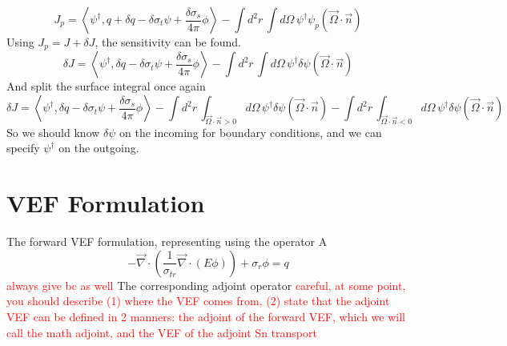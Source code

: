 \documentclass{article}
\newcommand{\vO}{\vec{\Omega}}
\newcommand{\bra}{\left\langle}
\newcommand{\ket}{\right\rangle}
\newcommand{\vdiv}{\vec{\nabla} \cdot}
\begin{document}
\[
J_p = \bra \psi^\dag ,  q + \delta q - \delta \sigma_t \psi + \frac{ \delta \sigma_s }{4 \pi}  \phi     \ket -  \int d^2 r \, \int d  \Omega \, \psi^\dag \psi_p ( \vO \cdot \vec{n})
\] 
Using $J_p = J + \delta J$, the sensitivity can be found. 
\[
\delta J = \bra \psi^\dag ,  \delta q - \delta \sigma_t \psi + \frac{ \delta \sigma_s }{4 \pi}  \phi    \ket -  \int d^2 r \, \int d  \Omega \, \psi^\dag \delta \psi ( \vO \cdot \vec{n})
\] 
And split the surface integral once again
\[
\delta J = \bra \psi^\dag ,  \delta q - \delta \sigma_t \psi + \frac{ \delta \sigma_s }{4 \pi}  \phi    \ket
- \int d^2 r \, \int_{\vO \cdot \vec{n} >0} d  \Omega \, \psi^\dag \delta \psi ( \vO \cdot \vec{n} ) 
- \int d^2 r \, \int_{\vO \cdot \vec{n} <0} d  \Omega \, \psi^\dag \delta \psi ( \vO \cdot \vec{n} )
\]
So we should know $\delta \psi$ on the incoming for boundary conditions, and we can specify $\psi^\dag$ on the outgoing.

\section{VEF Formulation}

The forward VEF formulation, representing using the operator A
\[ -\vdiv \left( \frac{1}{\sigma_{tr}} \vdiv \left( E \phi \right) \right)
+ \sigma_r \phi
= q
\]
\textcolor{red}{always give bc as well}
The corresponding adjoint operator \textcolor{red}{careful, at some point, you should describe (1) where the VEF comes from, (2) state that the adjoint VEF can be defined in 2 manners: the adjoint of the forward VEF, which we will call the math adjoint, and the VEF of the adjoint Sn transport}
\end{document}
